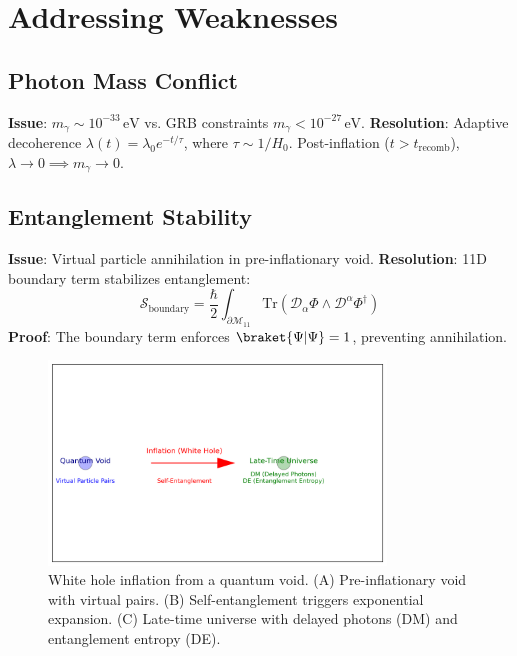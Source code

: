 \documentclass[12pt, a4paper]{article}
\begin{document}
\section{Addressing Weaknesses}
\label{sec:weaknesses}

\subsection{Photon Mass Conflict}
\label{subsec:photon_mass}
\textbf{Issue}: \( m_\gamma \sim 10^{-33} \, \text{eV} \) vs. GRB constraints \( m_\gamma < 10^{-27} \, \text{eV} \).
\textbf{Resolution}: Adaptive decoherence \( \lambda(t) = \lambda_0 e^{-t/\tau} \), where \( \tau \sim 1/H_0 \). Post-inflation (\( t > t_{\text{recomb}} \)), \( \lambda \to 0 \implies m_\gamma \to 0 \).

\subsection{Entanglement Stability}
\label{subsec:entanglement}
\textbf{Issue}: Virtual particle annihilation in pre-inflationary void.
\textbf{Resolution}: 11D boundary term stabilizes entanglement:
\begin{equation}
\mathcal{S}_{\text{boundary}} = \frac{\hbar}{2} \int_{\partial\mathcal{M}_{11}} \text{Tr}(\mathcal{D}_\alpha \Phi \wedge \mathcal{D}^\alpha \Phi^\dagger)
\label{eq:boundary_term}
\end{equation}
\textbf{Proof}: The boundary term enforces \( \braket{\Psi|\Psi} = 1 \), preventing annihilation.

\begin{figure}[t]
\centering
\includegraphics[width=0.8\textwidth]{white_hole_inflation.png}
\caption{White hole inflation from a quantum void. (A) Pre-inflationary void with virtual pairs. (B) Self-entanglement triggers exponential expansion. (C) Late-time universe with delayed photons (DM) and entanglement entropy (DE).}
\label{fig:white_hole}
\end{figure}
\end{document}
